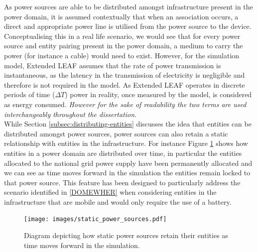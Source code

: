 \documentclass{l4proj}
\begin{document}
As power sources are able to be distributed amongst infrastructure present in the power domain, it is assumed contextually that when an association occurs, a direct and appropriate power line is utilised from the power source to the device.
Conceptualising this in a real life scenario, we would see that for every power source and entity pairing present in the power domain, a medium to carry the power (for instance a cable) would need to exist.
However, for the simulation model, Extended LEAF assumes that the rate of power transmission is instantaneous, as the latency in the transmission of electricity is negligible \citep{speed-of-electricity} and therefore is not required in the model.
As Extended LEAF operates in discrete periods of time ($\varDelta T$) power in reality, once measured by the model, is considered as energy consumed.
\textit{However for the sake of readability the two terms are used interchangeably throughout the dissertation}.\\

While Section \ref{subsec:distributing-entities} discusses the idea that entities can be distributed amongst power sources, power sources can also retain a static relationship with entities in the infrastructure.
For instance Figure \ref{fig:staticPower} shows how entities in a power domain are distributed over time, in particular the entities allocated to the national grid power supply have been permanently allocated and we can see as time moves forward in the simulation the entities remain locked to that power source.
This feature has been designed to particularly address the scenario identified in \ref{DOMEWHER} when considering entities in the infrastructure that are mobile and would only require the use of a battery.

\begin{figure}[h]
    \centering
    \texttt{[image: images/static\_power\_sources.pdf]}
    ~
    \caption{Diagram depicting how static power sources retain their entities as time moves forward in the simulation.}
    \label{fig:staticPower}
\end{figure}
\end{document}
